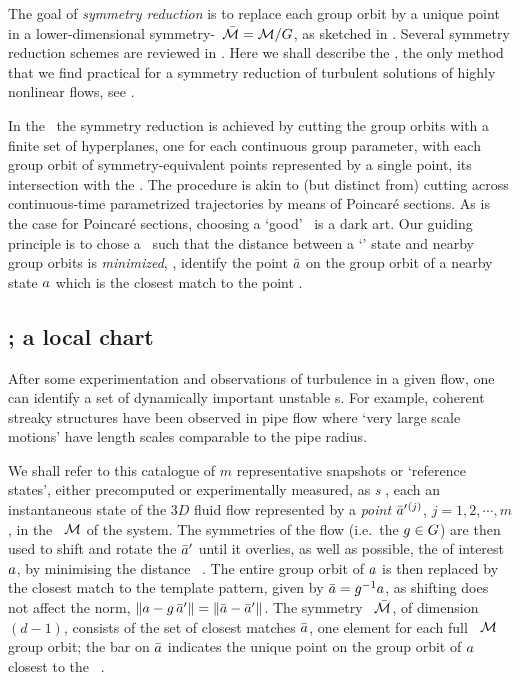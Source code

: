 \documentclass{jfm}
\begin{document}
The goal of \emph{symmetry reduction} is to replace each group orbit by a
unique point in a lower-dimensional symmetry-\reducedsp\ $\pSRed =
\pS/\Group$, as sketched in . Several symmetry
reduction schemes are reviewed in . Here we shall
describe the \mslices{}, the
only method that we find practical for a symmetry reduction of
turbulent solutions of highly nonlinear flows, see .

In the \mslices\ the symmetry reduction is achieved by cutting the group
orbits with a finite set of hyperplanes, one for each continuous group
parameter, with each group orbit of
symmetry-equivalent points represented by a single point, its
intersection with the \slice.
The procedure is akin to (but distinct from)
cutting across continuous-time parametrized trajectories by
means of Poincar\'e sections.
As is the case for Poincar\'e sections,
choosing a `good' \slice\ is a dark art. Our guiding principle is to chose
a \slice\ such that the distance between a `{\template}' state {\slicep} and nearby
group orbits is \emph{minimized}, \ie, identify the point $\bar{a}$ on the group
orbit  of a nearby state $a$ which is the closest
match to the {\template} point {\slicep}.


\subsection{\Mslices; a local chart}

After some experimentation and observations of turbulence in a given
flow, one can identify a set of dynamically important unstable
{\recurrStr s}.  For example, coherent streaky structures have been
observed in pipe flow where `very large scale motions' have
length scales comparable to the pipe radius.

We shall refer to this catalogue of $m$ representative snapshots
or `reference states', either precomputed or
experimentally measured, as  \emph{\template s}
, each an instantaneous state of the
$3D$ fluid flow represented by a
\emph{point} $\bar{a}'{}^{(j)}$, $j=1,2,\cdots,m$, in the
\statesp\ $\pS$ of the system. The symmetries of the flow (i.e.\ the
$g\in G$) are then used to shift and rotate the {\template}
$\bar{a}'$ until it overlies, as well as possible, the {\cohStr} of
interest $a$, by minimising the distance
\beq
\Norm{\ssp - \LieEl(\gSpace)\,\slicep}
\, .
The entire group orbit of $a$ is then replaced
by the closest match to
the template pattern,
given by
$\bar{a}=g^{-1}a$, %
as shifting does not affect the norm,
$\|{a-g\,\bar{a}'}\|=\|{\bar{a}-\bar{a}'}\|$.
The symmetry \reducedsp\ $\pSRed$, of dimension $(d\!-\!1)$, consists of
the set of closest matches $\bar{a}$, one element for each full \statesp\ $\pS$
group orbit; the bar on $\bar{a}$
indicates the unique point on the group orbit of $a$ closest to
the \template\ \slicep.
\end{document}
